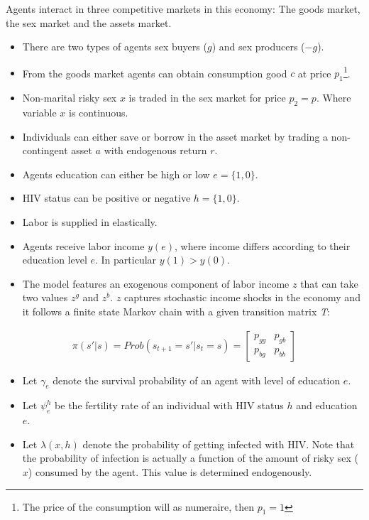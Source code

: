  Agents interact in three competitive markets in this economy: The goods market, the sex market and the assets market.  
\begin{itemize}
\item There are two types of agents sex buyers ($g$) and sex producers ($-g$).  
\item From the goods market agents can obtain consumption good $c$ at price $p_{1}$\footnote{The price of the consumption will as numeraire, then $p_{1}=1$}. 
\item Non-marital risky sex $x$ is traded in the sex market for price $p_{2}=p$. Where variable $x$ is continuous.
\item Individuals can either save or borrow in the asset market by trading a non-contingent asset $a$ with endogenous return $r$.
\item Agents education can either be high or low $e=\{1,0\}$.
\item HIV status can be positive or negative $h=\{1,0\}$.
\item Labor is supplied in elastically.
\item Agents receive labor income $y(e)$, where income differs according to their education level $e$. In particular $y(1)>y(0)$.
\item The model features an exogenous component of labor income $z$ that can take two values $z^{g}$ and $z^{b}$. $z$ captures stochastic income shocks in the economy and it follows a finite state Markov chain with a given transition matrix \textit{T}: 
\end{itemize}
\begin{align*}
    \pi(s'|s) = Prob(s_{t+1}=s'|s_{t}=s)=    \begin{bmatrix}%
    p_{gg} & p_{gb}\\
    p_{bg} & p_{bb}
    \end{bmatrix}
\end{align*}
\begin{itemize}
\item Let $\gamma_{e}$ denote the survival probability of an agent with level of education $e$.
\item Let $\psi^{h}_{e}$ be the fertility rate of an individual with HIV status $h$ and education $e$.
\item Let $\lambda(x,h)$ denote the probability of getting infected with HIV. Note that the probability of infection is actually a function of the amount of risky sex ($x$) consumed by the agent. This value is determined endogenously.
\end{itemize}
